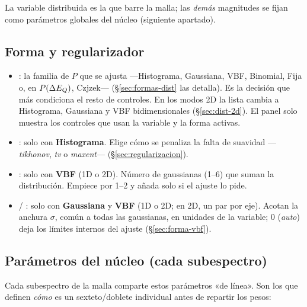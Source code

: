 La variable distribuida es la que barre la malla; las \emph{demás} magnitudes se
fijan como parámetros globales del núcleo (siguiente apartado).

\subsection{Forma y regularizador}

\begin{itemize}[nosep]
  \item {}: la familia de $P$ que se ajusta —Histograma, Gaussiana,
        VBF, Binomial, Fija o, en $P(\Delta E_{Q})$, Czjzek— (§\ref{sec:formas-dist} las detalla). Es la
        decisión que más condiciona el resto de controles. En los modos 2D la
        lista cambia a Histograma, Gaussiana y VBF bidimensionales
        (§\ref{sec:dist-2d}). El panel solo muestra los controles que usan la
        variable y la forma activas.
  \item {}: solo con \textbf{Histograma}. Elige cómo se penaliza
        la falta de suavidad —\emph{tikhonov}, \emph{tv} o \emph{maxent}—
        (§\ref{sec:regularizacion}).
  \item {}: solo con \textbf{VBF} (1D o 2D). Número de gaussianas (1--6)
        que suman la distribución. Empiece por 1--2 y añada solo si el ajuste lo
        pide.
  \item {} / : solo con \textbf{Gaussiana} y
        \textbf{VBF} (1D o 2D; en 2D, un par por eje). Acotan la anchura $\sigma$,
        común a todas las gaussianas, en unidades de la variable; $0$
        (\emph{auto}) deja los límites internos del ajuste
        (§\ref{sec:forma-vbf}).
\end{itemize}

\subsection{Parámetros del núcleo (cada subespectro)}
\label{sec:panel-kernel}

Cada subespectro de la malla comparte estos parámetros «de línea». Son los que
definen \emph{cómo} es un sexteto/doblete individual antes de repartir los pesos:

